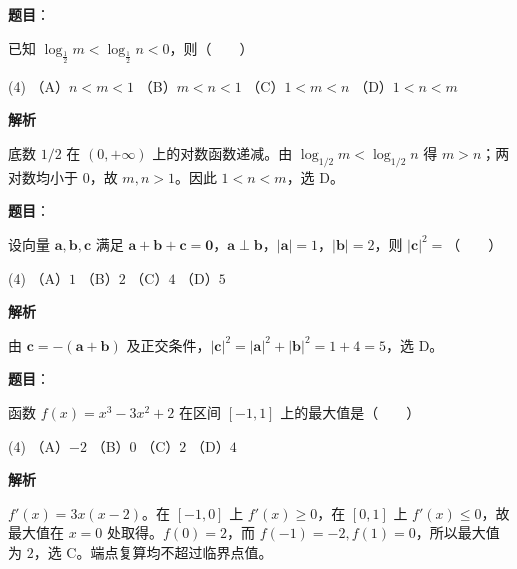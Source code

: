 \begin{answer}

\textbf{题目}：

已知 $\log_{\frac12}m<\log_{\frac12}n<0$，则\mbox{（　　）}

\begin{gkopts}(4)
\task （A）$n<m<1$
\task （B）$m<n<1$
\task （C）$1<m<n$
\task （D）$1<n<m$
\end{gkopts}

\textbf{解析}

底数 $1/2$ 在 $(0,+\infty)$ 上的对数函数递减。由 $\log_{1/2}m<\log_{1/2}n$ 得 $m>n$；两对数均小于 $0$，故 $m,n>1$。因此 $1<n<m$，选 D。


\end{answer}
\begin{answer}

\textbf{题目}：

设向量 $\boldsymbol a,\boldsymbol b,\boldsymbol c$ 满足 $\boldsymbol a+\boldsymbol b+\boldsymbol c=\boldsymbol 0$，$\boldsymbol a\perp\boldsymbol b$，$|\boldsymbol a|=1$，$|\boldsymbol b|=2$，则 $|\boldsymbol c|^2=$\mbox{（　　）}

\begin{gkopts}(4)
\task （A）$1$
\task （B）$2$
\task （C）$4$
\task （D）$5$
\end{gkopts}

\textbf{解析}

由 $\boldsymbol c=-(\boldsymbol a+\boldsymbol b)$ 及正交条件，$|\boldsymbol c|^2=|\boldsymbol a|^2+|\boldsymbol b|^2=1+4=5$，选 D。


\end{answer}
\begin{answer}

\textbf{题目}：

函数 $f(x)=x^3-3x^2+2$ 在区间 $[-1,1]$ 上的最大值是\mbox{（　　）}

\begin{gkopts}(4)
\task （A）$-2$
\task （B）$0$
\task （C）$2$
\task （D）$4$
\end{gkopts}

\textbf{解析}

$f'(x)=3x(x-2)$。在 $[-1,0]$ 上 $f'(x)\ge0$，在 $[0,1]$ 上 $f'(x)\le0$，故最大值在 $x=0$ 处取得。$f(0)=2$，而 $f(-1)=-2,f(1)=0$，所以最大值为 $2$，选 C。端点复算均不超过临界点值。


\end{answer}
